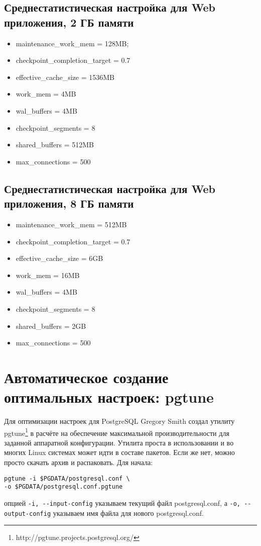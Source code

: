 \subsection{Среднестатистическая настройка для Web приложения, 2 ГБ памяти}

\begin{itemize}
\item maintenance\_work\_mem = 128MB;
\item checkpoint\_completion\_target = 0.7
\item effective\_cache\_size = 1536MB
\item work\_mem = 4MB
\item wal\_buffers = 4MB
\item checkpoint\_segments = 8
\item shared\_buffers = 512MB
\item max\_connections = 500
\end{itemize}

\subsection{Среднестатистическая настройка для Web приложения, 8 ГБ памяти}

\begin{itemize}
\item maintenance\_work\_mem = 512MB
\item checkpoint\_completion\_target = 0.7
\item effective\_cache\_size = 6GB
\item work\_mem = 16MB
\item wal\_buffers = 4MB
\item checkpoint\_segments = 8
\item shared\_buffers = 2GB
\item max\_connections = 500
\end{itemize}

\section{Автоматическое создание оптимальных настроек: pgtune}

Для оптимизации настроек для PostgreSQL Gregory Smith создал утилиту pgtune\footnote{http://pgtune.projects.postgresql.org/} 
в расчёте на обеспечение максимальной производительности для заданной аппаратной конфигурации.
Утилита проста в использовании и во многих Linux системах может идти в составе пакетов. 
Если же нет, можно просто скачать архив и распаковать.
Для начала:
\begin{lstlisting}[label=lst:p_settings1,caption=Pgtune]
pgtune -i $PGDATA/postgresql.conf \
-o $PGDATA/postgresql.conf.pgtune
\end{lstlisting}
опцией 
\lstinline[frame=tblr]{-i, --input-config}
указываем текущий файл postgresql.conf, 
а 
\lstinline[frame=tblr]{-o, --output-config}
указываем имя файла для нового postgresql.conf.

